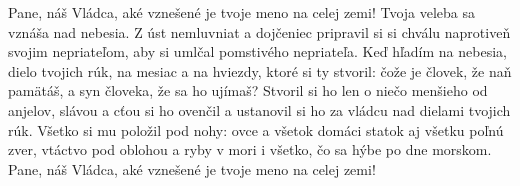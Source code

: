 Pane, náš Vládca,
aké vznešené je tvoje meno na celej zemi!
\versseparator
Tvoja veleba sa vznáša nad nebesia.
\versseparator
Z úst nemluvniat a dojčeniec pripravil si si chválu
naprotiveň svojim nepriateľom,
aby si umlčal pomstivého nepriateľa.
\versseparator
Keď hľadím na nebesia, dielo tvojich rúk,
na mesiac a na hviezdy, ktoré si ty stvoril:
\versseparator
čože je človek, že naň pamätáš,
a syn človeka, že sa ho ujímaš?
\versseparator
Stvoril si ho len o niečo menšieho od anjelov,
slávou a cťou si ho ovenčil
a ustanovil si ho za vládcu nad dielami tvojich rúk.
\versseparator
Všetko si mu položil pod nohy:
ovce a všetok domáci statok
aj všetku poľnú zver,
\versseparator
vtáctvo pod oblohou a ryby v mori
i všetko, čo sa hýbe po dne morskom.
\versseparator
Pane, náš Vládca,
aké vznešené je tvoje meno na celej zemi!
